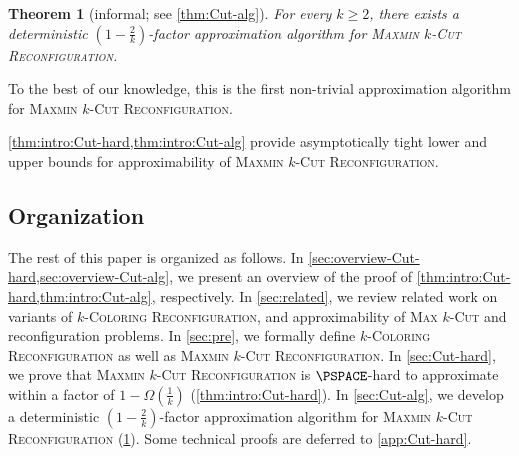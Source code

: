\documentclass[11pt,fleqn]{article}
\renewcommand{\geq}{\geqslant}
\newcommand{\prb}[1]{\textsc{#1}\xspace}
\newcommand{\kColReconf}{\prb{$k$-Coloring Reconfiguration}}
\newcommand{\MMkCutReconf}{\prb{Maxmin $k$-Cut Reconfiguration}}
\newtheorem{theorem}{Theorem}[section]
\theoremstyle{definition}
\numberwithin{equation}{section}
\begin{document}
\begin{theorem}[informal; see \cref{thm:Cut-alg}]
\label{thm:intro:Cut-alg}
    For every $k \geq 2$,
    there exists a deterministic $\left(1-\frac{2}{k}\right)$-factor
    approximation algorithm for \MMkCutReconf.
\end{theorem}\noindent
To the best of our knowledge, this is the first non-trivial approximation algorithm for \MMkCutReconf.

\cref{thm:intro:Cut-hard,thm:intro:Cut-alg} provide
asymptotically tight lower and upper bounds for approximability of \MMkCutReconf.


\subsection{Organization}
The rest of this paper is organized as follows.
In \cref{sec:overview-Cut-hard,sec:overview-Cut-alg},
    we present an overview of the proof of \cref{thm:intro:Cut-hard,thm:intro:Cut-alg},
    respectively.
In \cref{sec:related},
    we review related work on
    variants of \kColReconf, and
    approximability of \prb{Max $k$-Cut} and reconfiguration problems.
In \cref{sec:pre},
    we formally define \kColReconf as well as \MMkCutReconf.
In \cref{sec:Cut-hard},
    we prove that
    \MMkCutReconf is $\PSPACE$-hard to approximate within a factor of $1-\Omega\left(\frac{1}{k}\right)$ 
    (\cref{thm:intro:Cut-hard}).
In \cref{sec:Cut-alg},
    we develop a deterministic $\left(1-\frac{2}{k}\right)$-factor approximation algorithm for 
    \MMkCutReconf
    (\cref{thm:intro:Cut-alg}).
Some technical proofs are deferred to \cref{app:Cut-hard}.
\end{document}
